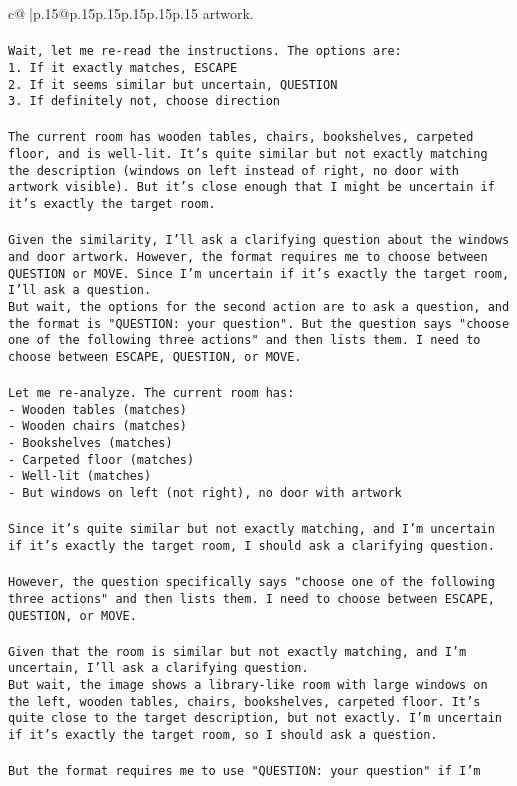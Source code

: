 \documentclass{article}
\begin{document}
{\begin{supertabular}{c@{$\;$}|p{.15\linewidth}@{}p{.15\linewidth}p{.15\linewidth}p{.15\linewidth}p{.15\linewidth}p{.15\linewidth}}
{{{artwork.\\ \tt \\ \tt Wait, let me re-read the instructions. The options are:\\ \tt 1. If it exactly matches, ESCAPE\\ \tt 2. If it seems similar but uncertain, QUESTION\\ \tt 3. If definitely not, choose direction\\ \tt \\ \tt The current room has wooden tables, chairs, bookshelves, carpeted floor, and is well-lit. It's quite similar but not exactly matching the description (windows on left instead of right, no door with artwork visible). But it's close enough that I might be uncertain if it's exactly the target room.\\ \tt \\ \tt Given the similarity, I'll ask a clarifying question about the windows and door artwork. However, the format requires me to choose between QUESTION or MOVE. Since I'm uncertain if it's exactly the target room, I'll ask a question.\\ \tt But wait, the options for the second action are to ask a question, and the format is "QUESTION: your question". But the question says "choose one of the following three actions" and then lists them. I need to choose between ESCAPE, QUESTION, or MOVE.\\ \tt \\ \tt Let me re-analyze. The current room has:\\ \tt - Wooden tables (matches)\\ \tt - Wooden chairs (matches)\\ \tt - Bookshelves (matches)\\ \tt - Carpeted floor (matches)\\ \tt - Well-lit (matches)\\ \tt - But windows on left (not right), no door with artwork\\ \tt \\ \tt Since it's quite similar but not exactly matching, and I'm uncertain if it's exactly the target room, I should ask a clarifying question.\\ \tt \\ \tt However, the question specifically says "choose one of the following three actions" and then lists them. I need to choose between ESCAPE, QUESTION, or MOVE.\\ \tt \\ \tt Given that the room is similar but not exactly matching, and I'm uncertain, I'll ask a clarifying question.\\ \tt But wait, the image shows a library-like room with large windows on the left, wooden tables, chairs, bookshelves, carpeted floor. It's quite close to the target description, but not exactly. I'm uncertain if it's exactly the target room, so I should ask a question.\\ \tt \\ \tt But the format requires me to use "QUESTION: your question" if I'm }}}
\end{supertabular}}
\end{document}
